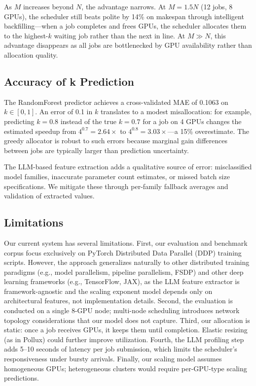 \documentclass[letterpaper,10pt]{article}
\begin{document}
As $M$ increases beyond $N$, the advantage narrows. At $M = 1.5N$ (12 jobs, 8 GPUs), the scheduler still beats polite by 14\% on makespan through intelligent backfilling---when a job completes and frees GPUs, the scheduler allocates them to the highest-$k$ waiting job rather than the next in line. At $M \gg N$, this advantage disappears as all jobs are bottlenecked by GPU availability rather than allocation quality.

\subsection{Accuracy of k Prediction}

The RandomForest predictor achieves a cross-validated MAE of 0.1063 on $k \in [0, 1]$. An error of 0.1 in $k$ translates to a modest misallocation: for example, predicting $k = 0.8$ instead of the true $k = 0.7$ for a job on 4 GPUs changes the estimated speedup from $4^{0.7} = 2.64\times$ to $4^{0.8} = 3.03\times$---a 15\% overestimate. The greedy allocator is robust to such errors because marginal gain differences between jobs are typically larger than prediction uncertainty.

The LLM-based feature extraction adds a qualitative source of error: misclassified model families, inaccurate parameter count estimates, or missed batch size specifications. We mitigate these through per-family fallback averages and validation of extracted values.

\subsection{Limitations}

Our current system has several limitations. First, our evaluation and benchmark corpus focus exclusively on PyTorch Distributed Data Parallel (DDP) training scripts. However, the approach generalizes naturally to other distributed training paradigms (e.g., model parallelism, pipeline parallelism, FSDP) and other deep learning frameworks (e.g., TensorFlow, JAX), as the LLM feature extractor is framework-agnostic and the scaling exponent model depends only on architectural features, not implementation details. Second, the evaluation is conducted on a single 8-GPU node; multi-node scheduling introduces network topology considerations that our model does not capture. Third, our allocation is static: once a job receives GPUs, it keeps them until completion. Elastic resizing (as in Pollux) could further improve utilization. Fourth, the LLM profiling step adds 5--10 seconds of latency per job submission, which limits the scheduler's responsiveness under bursty arrivals. Finally, our scaling model assumes homogeneous GPUs; heterogeneous clusters would require per-GPU-type scaling predictions.
\end{document}
